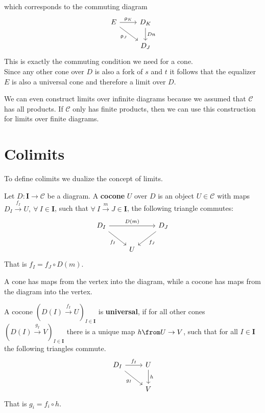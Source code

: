which corresponds to the commuting diagram
\[
  \begin{tikzcd}
    E \arrow{r}{\uprho_K} \arrow{dr}[swap]{\uprho_J} & D_K \arrow{d}{Dn}\\
    & D_J
  \end{tikzcd}
\]
This is exactly the commuting condition we need for a cone.\\
Since any other cone over $D$
is also a fork of $s$ and $t$
it follows that the equalizer $E$ is also a universal cone
and therefore a limit over $D$.
\begin{remark}
  We can even construct limits over infinite diagrams
  because we assumed that $\mathscr C$ has all products.
  If $\mathscr C$ only has finite products, then we can
  use this construction for
  limits over finite diagrams.
\end{remark}

\chapter{Colimits}
To define colimits we dualize the concept of limits.
\begin{definition}
  Let $D : \bm I \to \mathscr C$ be a diagram.
  A \textbf{cocone} $U$ over $D$ is an object $U \in \mathscr{C}$
  with maps $D_I \overset{ f_I}{\rightarrow} U,\ \forall\ I \in \bm{I}$, such that
  $\forall\ I \overset{m}{\to} J \in \bm{I}$, the following triangle commutes:
  \[
    \begin{tikzcd}
      D_I \arrow[rr, "D(m)"]\arrow[dr, swap, "f_I"] & & D_J \arrow{dl}{f_J}\\
      & U  &
    \end{tikzcd}
  \]
  That is $f_I = f_J \circ D(m)$.
\end{definition}
A cone has maps from the vertex into the diagram,
while a cocone has maps from the diagram into the vertex.
\begin{definition}
  A cocone $(D(I)\overset{f_I}{\to} U)_{I\in \bm{I}}$ is \textbf{universal}, if
  for all other cones $(D(I) \overset{g_I}{\to} V)_{I\in \bm{I}}$ there is a unique
  map $h \from U \to V$, such that for all $I \in \bm{I}$
  the following triangles commute.
  \[
    \begin{tikzcd}
      D_I \arrow[dr, swap, "g_I"] \arrow{r}{f_I} & U \arrow{d}{h} \\
      & V
    \end{tikzcd}
  \]
  That is $g_i = f_i \circ h$.
\end{definition}

